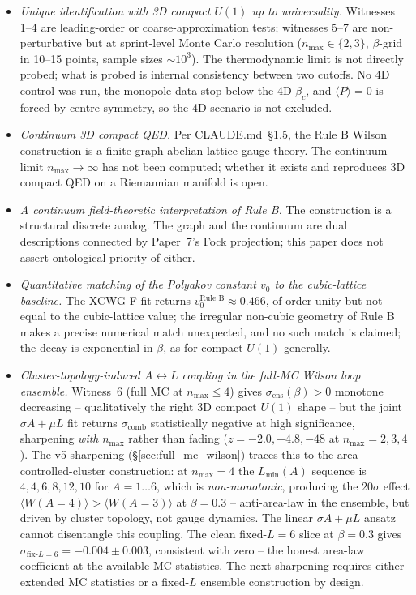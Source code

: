 \documentclass[11pt]{article}
\begin{document}
\begin{itemize}
\item[(i)] \emph{Unique identification with 3D compact $U(1)$ up to
universality.} Witnesses 1--4 are leading-order or coarse-approximation
tests; witnesses 5--7 are non-perturbative but at sprint-level Monte Carlo
resolution ($n_\text{max}\in\{2,3\}$, $\beta$-grid in 10--15 points, sample
sizes $\sim 10^3$). The thermodynamic limit is not directly probed; what is
probed is internal consistency between two cutoffs.  No 4D control was
run, the monopole data stop below the 4D $\beta_c$, and $\langle P\rangle = 0$
is forced by centre symmetry, so the 4D scenario is not excluded.

\item[(ii)] \emph{Continuum 3D compact QED.} Per CLAUDE.md~\S 1.5, the Rule B
Wilson construction is a finite-graph abelian lattice gauge theory. The
continuum limit $n_\text{max}\to\infty$ has not been computed; whether it
exists and reproduces 3D compact QED on a Riemannian manifold is open.

\item[(iii)] \emph{A continuum field-theoretic interpretation of Rule B.}
The construction is a structural discrete analog. The graph and the continuum
are dual descriptions connected by Paper~7's Fock projection; this paper does
not assert ontological priority of either.

\item[(iv)] \emph{Quantitative matching of the Polyakov constant $v_0$ to the
cubic-lattice baseline.} The XCWG-F fit returns $v_0^\text{Rule B}\approx 0.466$,
of order unity but not equal to the cubic-lattice value; the irregular
non-cubic geometry of Rule B makes a precise numerical match unexpected, and
no such match is claimed; the decay is exponential in $\beta$, as for compact
$U(1)$ generally.

\item[(v)] \emph{Cluster-topology-induced $A\leftrightarrow L$ coupling in
the full-MC Wilson loop ensemble.} Witness~6 (full MC at $n_\text{max}\le 4$)
gives $\sigma_\text{ens}(\beta)>0$ monotone decreasing -- qualitatively the
right 3D compact $U(1)$ shape -- but the joint $\sigma A+\mu L$ fit returns
$\sigma_\text{comb}$ statistically negative at high significance, sharpening
\emph{with} $n_\text{max}$ rather than fading ($z=-2.0,-4.8,-48$ at
$n_\text{max}=2,3,4$). The v5 sharpening (\S\ref{sec:full_mc_wilson}) traces
this to the area-controlled-cluster construction: at $n_\text{max}=4$ the
$L_\text{min}(A)$ sequence is $4,4,6,8,12,10$ for $A=1\ldots 6$, which is
\emph{non-monotonic}, producing the $20\sigma$ effect
$\langle W(A=4)\rangle>\langle W(A=3)\rangle$ at $\beta=0.3$ -- anti-area-law
in the ensemble, but driven by cluster topology, not gauge dynamics. The
linear $\sigma A+\mu L$ ansatz cannot disentangle this coupling. The clean
fixed-$L=6$ slice at $\beta=0.3$ gives $\sigma_{\text{fix-}L=6}=-0.004\pm 0.003$,
consistent with zero -- the honest area-law coefficient at the available MC
statistics.  The next sharpening requires either extended MC statistics or a
fixed-$L$ ensemble construction by design.


\end{itemize}
\end{document}
